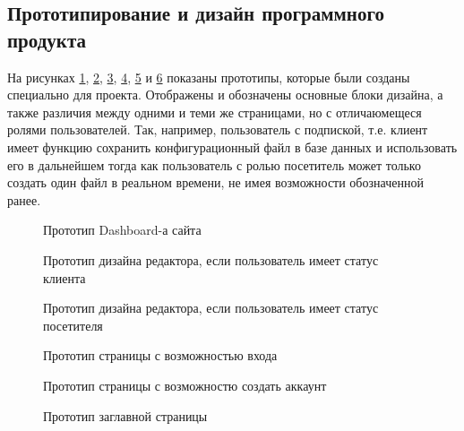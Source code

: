 \subsection{Прототипирование и дизайн программного продукта}

На рисунках \ref{des:proto_1}, \ref{des:proto_2}, \ref{des:proto_3}, \ref{des:proto_4}, \ref{des:proto_5} и
\ref{des:proto_6} показаны прототипы, которые были созданы специально для проекта. Отображены и обозначены основные блоки дизайна, а также различия между
одними и теми же страницами, но с отличаюмещеся ролями пользователей. Так, например, пользователь с подпиской, т.е. клиент имеет функцию сохранить конфигурационный файл
в базе данных и использовать его в дальнейшем тогда как пользователь с ролью посетитель может только создать один файл в реальном времени, не имея возможности обозначенной ранее.

\begin{figure}[H]
    \caption{Прототип Dashboard-а сайта}
    \label{des:proto_1}
\end{figure}

\begin{figure}[H]
    \caption{Прототип дизайна редактора, если пользователь имеет статус клиента}
    \label{des:proto_2}
\end{figure}

\begin{figure}[H]
    \caption{Прототип дизайна редактора, если пользователь имеет статус посетителя}
    \label{des:proto_3}
\end{figure}

\begin{figure}[H]
    \caption{Прототип страницы с возможностью входа}
    \label{des:proto_4}
\end{figure}

\begin{figure}[H]
    \caption{Прототип страницы с возможностю создать аккаунт}
    \label{des:proto_5}
\end{figure}

\begin{figure}[H]
    \caption{Прототип заглавной страницы}
    \label{des:proto_6}
\end{figure}

